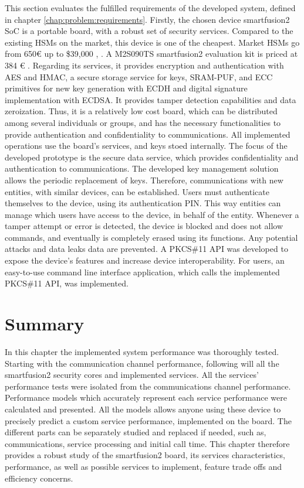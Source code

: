 This section evaluates the fulfilled requirements of the developed system, defined in chapter \ref{chap:problem:requirements}.
Firstly, the chosen device smartfusion2 SoC is a portable board, with a robust set of security services.
Compared to the existing HSMs on the market, this device is one of the cheapest. Market \ac{HSM}s go from 650€ up to \$39,000 \cite{HSMpriceArticles}, \cite{HSMPresentationPrices}. A M2S090TS smartfusion2 evaluation kit is priced at 384 € \cite{smartfusionPrice}.
Regarding its services, it provides encryption and authentication with \ac{AES} and \ac{HMAC}, a secure storage service for keys, SRAM-PUF, and \ac{ECC} primitives for new key generation with \ac{ECDH} and digital signature implementation with \ac{ECDSA}. It provides tamper detection capabilities and data zeroization.
Thus, it is a relatively low cost board, which can be distributed among several individuals or groups, and has the necessary functionalities to provide authentication and confidentiality to communications.
All implemented operations use the board's services, and keys stoed internally.
The focus of the developed prototype is the secure data service, which provides confidentiality and authentication to communications.
The developed key management solution allows the periodic replacement of keys. Therefore, communications with new entities, with similar devices, can be established.
Users must authenticate themselves to the device, using its authentication PIN. This way entities can manage which users have access to the device, in behalf of the entity.
Whenever a tamper attempt or error is detected, the device is blocked and does not allow commands, and eventually is completely erased using its functions. Any potential attacks and data leaks data are prevented.
A PKCS\#11 API was developed to expose the device's features and increase device interoperability. For users, an easy-to-use command line interface application, which calls the implemented PKCS\#11 API, was implemented.

\section*{Summary}\label{chap:evaluation:summary}

In this chapter the implemented system performance was thoroughly tested. Starting with the communication channel performance, following will all the smartfusion2 security cores and implemented services. All the services' performance tests were isolated from the communications channel performance. Performance models which accurately represent each service performance were calculated and presented. All the models allows anyone using these device to precisely predict a custom service performance, implemented on the board. The different parts can be separately studied and replaced if needed, such as, communications, service processing and initial call time. This chapter therefore provides a robust study of the smartfusion2 board, its services characteristics, performance, as well as possible services to implement, feature trade offs and efficiency concerns.
